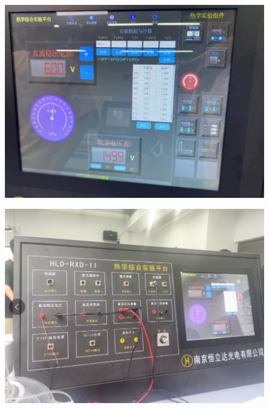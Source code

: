 \documentclass[UTF8]{article}
\begin{document}
	\begin{figure}[H]
	   \begin{minipage}[t]{0.5\linewidth}
	      \centering
	      \includegraphics[clip,scale=0.5,trim={0 0 0 0}]{fig/fig5.png}
	      \label{figure.9}
	   \end{minipage}
	   \begin{minipage}[t]{0.5\linewidth}
	      \centering
	      \includegraphics[clip,scale=0.5,trim={0 0 0 0}]{fig/fig6.png}
	      \label{figure.10}
	   \end{minipage}
	   	  
	\end{figure} 
	
\end{document}
